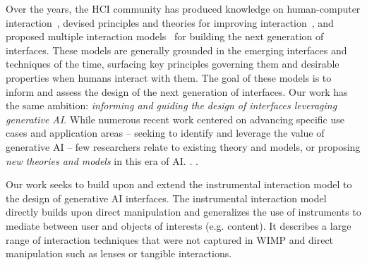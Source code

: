 Over the years, the HCI community has produced knowledge on human-computer interaction~\cite{hornbaek2017interaction}, devised principles and theories for improving interaction~\cite{hutchins1985direct,  gibson1977theory}, and proposed multiple interaction models~\cite{beaudouin2000instrumental,jacob2008reality} for building the next generation of interfaces. These models are generally grounded in the emerging interfaces and techniques of the time, surfacing key principles governing them and desirable properties when humans interact with them. The goal of these models is to inform and assess the design of the next generation of interfaces. Our work has the same ambition: \textit{informing and guiding the design of interfaces leveraging generative AI}. While numerous recent work centered on advancing specific use cases and application areas -- seeking to identify and leverage the value of generative AI -- few researchers relate to existing theory and models, or proposing \textit{new theories and models} in this era of AI. . . 


Our work seeks to build upon and extend the instrumental interaction model to the design of generative AI interfaces. The instrumental interaction model~\cite{beaudouin2000instrumental} directly builds upon direct manipulation and generalizes the use of instruments to mediate between user and objects of interests (e.g. content). It describes a large range of interaction techniques that were not captured in WIMP and direct manipulation such as lenses or tangible interactions. 






